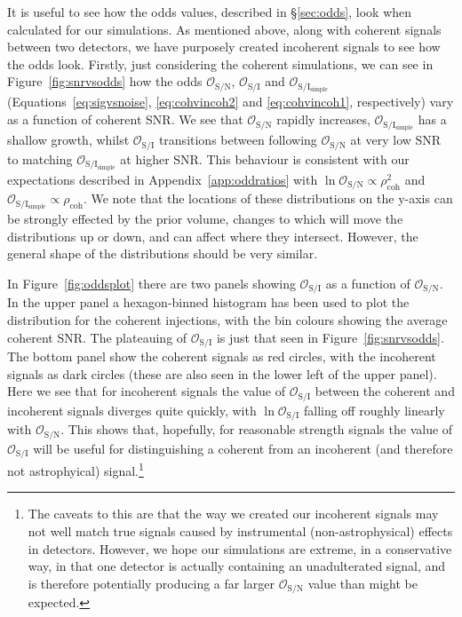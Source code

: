It is useful to see how the odds values, described in \S\ref{sec:odds}, look when calculated for our simulations. As mentioned above, along with coherent
signals between two detectors, we have purposely created incoherent signals to see how the odds look. Firstly, just considering the coherent simulations,
we can see in Figure~\ref{fig:snrvsodds} how the odds $\mathcal{O}_{\text{S}/\text{N}}$, $\mathcal{O}_{\text{S}/\text{I}}$ and
$\mathcal{O}_{\text{S}/\text{I}_{\text{simple}}}$ (Equations~\ref{eq:sigvsnoise}, \ref{eq:cohvincoh2} and \ref{eq:cohvincoh1}, respectively) vary as a function
of coherent SNR. We see that $\mathcal{O}_{\text{S}/\text{N}}$ rapidly increases, $\mathcal{O}_{\text{S}/\text{I}_{\text{simple}}}$ has a shallow growth,
whilst $\mathcal{O}_{\text{S}/\text{I}}$ transitions between following $\mathcal{O}_{\text{S}/\text{N}}$ at very low SNR to matching 
$\mathcal{O}_{\text{S}/\text{I}_{\text{simple}}}$ at higher SNR. This behaviour is consistent with our expectations described in Appendix~\ref{app:oddratios} with
$\ln{\mathcal{O}_{\text{S}/\text{N}}} \propto \rho_{\text{coh}}^2$ and $\mathcal{O}_{\text{S}/\text{I}_{\text{simple}}} \propto \rho_{\text{coh}}$.
We note that the locations of these distributions on the y-axis can be strongly effected by the prior volume, changes to which will move the distributions
up or down, and can affect where they intersect. However, the general shape of the distributions should be very similar.

In Figure~\ref{fig:oddsplot} there are two panels showing $\mathcal{O}_{\text{S}/\text{I}}$ as a function of $\mathcal{O}_{\text{S}/\text{N}}$. In the upper
panel a hexagon-binned histogram has been used to plot the distribution for the coherent injections, with the bin colours showing the average
coherent SNR. The plateauing of $\mathcal{O}_{\text{S}/\text{I}}$ is just that seen in Figure~\ref{fig:snrvsodds}. The bottom panel show the coherent signals
as red circles, with the incoherent signals as dark circles (these are also seen in the lower left of the upper panel). Here we see that for incoherent signals
the value of $\mathcal{O}_{\text{S}/\text{I}}$ between the coherent and incoherent signals diverges quite quickly, with $\ln{\mathcal{O}_{\text{S}/\text{I}}}$
falling off roughly linearly with $\mathcal{O}_{\text{S}/\text{N}}$. This shows that, hopefully, for reasonable strength signals the value of
$\mathcal{O}_{\text{S}/\text{I}}$ will be useful for distinguishing a coherent from an incoherent (and therefore not astrophyical) signal.\footnote{The caveats
to this are that the way we created our incoherent signals may not well match true signals caused by instrumental (non-astrophysical) effects in \gw detectors.
However, we hope our simulations are extreme, in a conservative way, in that one detector is actually containing an unadulterated signal, and is therefore
potentially producing a far larger $\mathcal{O}_{\text{S}/\text{N}}$ value than might be expected.}

